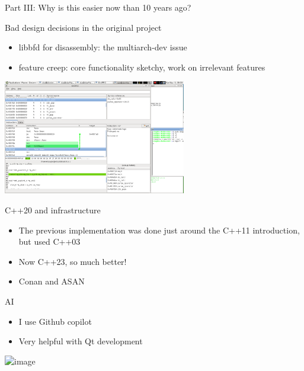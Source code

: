\documentclass{beamer}
\begin{document}
\begin{frame}{Part III: Why is this easier now than 10 years ago?}
\end{frame}

\begin{frame}{Bad design decisions in the original project}
  \begin{itemize}
    \item libbfd for disassembly: the multiarch-dev issue
    \item feature creep: core functionality sketchy, work on irrelevant features
  \end{itemize}

  \includegraphics[width=8cm]{old_emilpro}

\end{frame}

\begin{frame}{C++20 and infrastructure}
  \begin{itemize}
    \item The previous implementation was done just around the C++11 introduction, but used C++03
    \item Now C++23, so much better!
    \item Conan and ASAN




  \end{itemize}
\end{frame}

\begin{frame}{AI}
  \begin{itemize}
    \item I use Github copilot
    \item Very helpful with Qt development
  \end{itemize}
  \includegraphics<2>[height=8cm]{copilot_calls_functions}

\end{frame}
\end{document}
